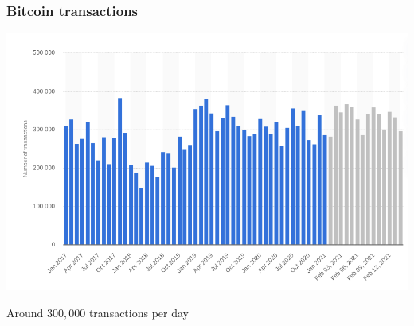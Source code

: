 \documentclass[11pt]{beamer}  %
\begin{document}
\begin{frame}\frametitle{Bitcoin transactions}

  \begin{center}
    \includegraphics[scale=0.3,clip=false]{pictures/bitcoin-daily.png}
  \end{center}

  \begin{center}
    Around $300,000$ transactions per day
  \end{center}

\end{frame}
\end{document}
